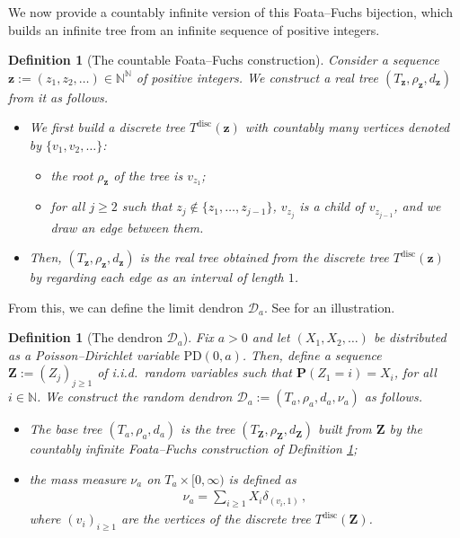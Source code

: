 \documentclass{article}
\newtheorem{definition}[theorem]{Definition}
\theoremstyle{remark}
\newcommand{\bN}{\mathbb{N}}
\newcommand{\cD}{\mathcal{D}}
\newcommand{\bz}{\textbf{z}}
\newcommand{\boldZ}{\textbf{Z}}
\newcommand{\prob}[1]{\mathbf{P}{\left(#1\right)}}
\newcommand{\PoissonDirichlet}[2]{\mathrm{PD}{\left(#1,#2\right)}}
\DeclareMathOperator{\discrete}{disc}
\begin{document}
We now provide a countably infinite version of this Foata--Fuchs bijection, which builds an infinite tree from an infinite sequence of positive integers.

\begin{definition}[The countable Foata--Fuchs construction]
\label{def:countable foata}
Consider a sequence $\bz := (z_1,z_2,\ldots) \in \bN^\bN$ of positive integers. 
We construct a real tree $(T_\bz,\rho_\bz,d_\bz)$ from it as follows.
\begin{itemize}
    \item We first build a discrete tree $T^{\discrete}(\bz)$ with countably many vertices denoted by $\{v_1,v_2, \ldots\}$:
    \begin{itemize}
        \item the root $\rho_\bz$ of the tree is $v_{z_1}$;
        \item for all $j \geq 2$ such that $z_j \notin \{z_1,\ldots,z_{j-1}\}$, $v_{z_j}$ is a child of $v_{z_{j-1}}$, and we draw an edge between them.    
        \end{itemize}
    \item Then, $(T_\bz,\rho_\bz,d_\bz)$ is the real tree obtained from the discrete tree $T^{\discrete}(\bz)$ by regarding each edge as an interval of length $1$.
\end{itemize}
\end{definition}

From this, we can define the limit dendron $\cD_a$.
See  for an illustration.

\begin{definition}[The dendron $\cD_a$]\label{def: size-biased dendron}
Fix $a>0$ and let $(X_1,X_2,\ldots)$ be distributed as a Poisson--Dirichlet variable $\PoissonDirichlet{0}{a}$. 
Then, define a sequence $\boldZ := (Z_j)_{j \geq 1}$ of i.i.d.\ random variables such that $\prob{Z_1=i}=X_i$, for all $i \in \mathbb{N}$. 
We construct the random dendron $\cD_a:=(T_a,\rho_a,d_a,\nu_a)$ as follows. 
\begin{itemize}
    \item The base tree $(T_a,\rho_a,d_a)$ is the tree $(T_{\boldZ},\rho_\boldZ,d_\boldZ)$ built from $\boldZ$ by the countably infinite Foata--Fuchs construction of Definition \ref{def:countable foata};
    \item the mass measure $\nu_a$ on $T_a \times [0,\infty)$ is defined as
    \begin{align*}
        \nu_a = \sum_{i \geq 1} X_i \delta_{(v_i,1)} \,,
    \end{align*}
    where $(v_i)_{i\ge1}$ are the vertices of the discrete tree $T^{\discrete}(\boldZ)$.
\end{itemize}
\end{definition}
\end{document}
